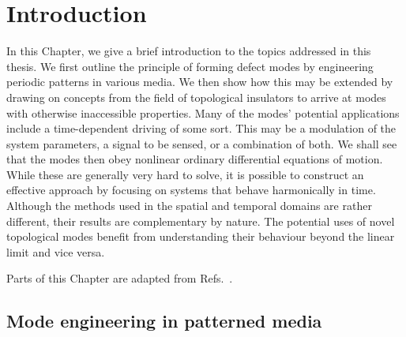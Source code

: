 
\nocite{Kosata_2022a, Kosata_2022b, Kosata_2021, Kosata_2020}
\nocite{Grob_2019, Kosata_2018b, Kosata_2018a, Nilsen_2017}

\chapter{Introduction} \label{ch:intro} 

\begin{chapterabstract}
	
	In this Chapter, we give a brief introduction to the topics addressed in this thesis. We first outline the principle of forming defect modes by engineering periodic patterns in various media. We then show how this may be extended by drawing on concepts from the field of topological insulators to arrive at modes with otherwise inaccessible properties. 
	Many of the modes' potential applications include a time-dependent driving of some sort. This may be a modulation of the system parameters, a signal to be sensed, or a combination of both. We shall see that the modes then obey nonlinear ordinary differential equations of motion. While these are generally very hard to solve, it is possible to construct an effective approach by focusing on systems that behave harmonically in time.
	Although the methods used in the spatial and temporal domains are rather different, their results are complementary by nature. The potential uses of novel topological modes benefit from understanding their behaviour beyond the linear limit and vice versa.

	\tcblower
	Parts of this Chapter are adapted from Refs.~\cite{Kosata_2022a, Kosata_2021}.
\end{chapterabstract}

\section{Mode engineering in patterned media} \label{sec:intro_spatial}

